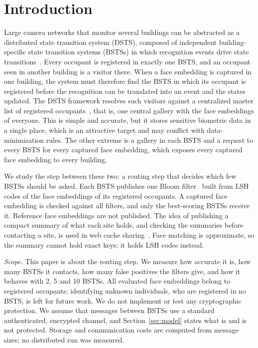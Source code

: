 \documentclass[pdflatex,sn-mathphys-num]{sn-jnl}%
\theoremstyle{thmstyleone}%
\theoremstyle{thmstyletwo}%
\theoremstyle{thmstylethree}%
\begin{document}

\maketitle

\section{Introduction}\label{sec1}

Large camera networks that monitor several buildings can be abstracted as a distributed state transition system (DSTS), composed of independent building-specific state transition systems (BSTSs) in which recognition events drive state transitions~\cite{mohan2020}. Every occupant is registered in exactly one BSTS, and an occupant seen in another building is a visitor there. When a face embedding is captured in one building, the system must therefore find the BSTS in which its occupant is registered before the recognition can be translated into an event and the states updated. The DSTS framework resolves such visitors against a centralized master list of registered occupants~\cite{mohan2020}, that is, one central gallery with the face embeddings of everyone. This is simple and accurate, but it stores sensitive biometric data in a single place, which is an attractive target and may conflict with data-minimization rules. The other extreme is a gallery in each BSTS and a request to every BSTS for every captured face embedding, which exposes every captured face embedding to every building.

We study the step between these two: a routing step that decides which few BSTSs should be asked. Each BSTS publishes one Bloom filter~\cite{bloom1970} built from LSH codes of the face embeddings of its registered occupants. A captured face embedding is checked against all filters, and only the best-scoring BSTSs receive it. Reference face embeddings are not published. The idea of publishing a compact summary of what each site holds, and checking the summaries before contacting a site, is used in web cache sharing~\cite{fan2000}. Face matching is approximate, so the summary cannot hold exact keys; it holds LSH codes instead.

\emph{Scope.} This paper is about the routing step. We measure how accurate it is, how many BSTSs it contacts, how many false positives the filters give, and how it behaves with 2, 5 and 10 BSTSs. All evaluated face embeddings belong to registered occupants; identifying unknown individuals, who are registered in no BSTS, is left for future work. We do not implement or test any cryptographic protection. We assume that messages between BSTSs use a standard authenticated, encrypted channel, and Section~\ref{sec:model} states what is and is not protected. Storage and communication costs are computed from message sizes; no distributed run was measured.
\end{document}
